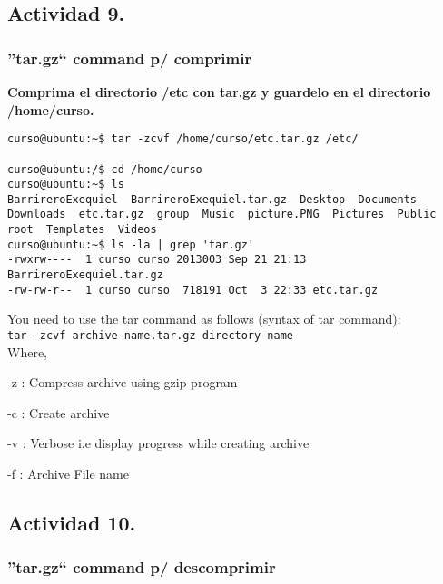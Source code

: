\documentclass[a4paper,11pt,spanish]{article} %
\newenvironment{myscriptlisting}
{\begin{list}{}{\setlength{\leftmargin}{1em}}\item\scriptsize\bfseries}
{\end{list}}
\begin{document}
\subsection{Actividad 9.}

\subsubsection{''tar.gz`` command p/ comprimir}

\textbf{Comprima el directorio /etc con tar.gz y guardelo en el directorio /home/curso.}

\begin{myscriptlisting}
 \begin{verbatim}
curso@ubuntu:~$ tar -zcvf /home/curso/etc.tar.gz /etc/

curso@ubuntu:/$ cd /home/curso
curso@ubuntu:~$ ls 
BarrireroExequiel  BarrireroExequiel.tar.gz  Desktop  Documents  Downloads  etc.tar.gz  group  Music  picture.PNG  Pictures  Public  root  Templates  Videos
curso@ubuntu:~$ ls -la | grep 'tar.gz'
-rwxrw----  1 curso curso 2013003 Sep 21 21:13 BarrireroExequiel.tar.gz
-rw-rw-r--  1 curso curso  718191 Oct  3 22:33 etc.tar.gz
 \end{verbatim}
\end{myscriptlisting}

You need to use the tar command as follows (syntax of tar command):\\

\texttt{tar -zcvf archive-name.tar.gz directory-name}\\

Where,

-z : Compress archive using gzip program

-c : Create archive

-v : Verbose i.e display progress while creating archive

-f : Archive File name \\

\cite{vivkg}

\pagebreak

\subsection{Actividad 10.}

\subsubsection{''tar.gz`` command p/ descomprimir}
\end{document}
